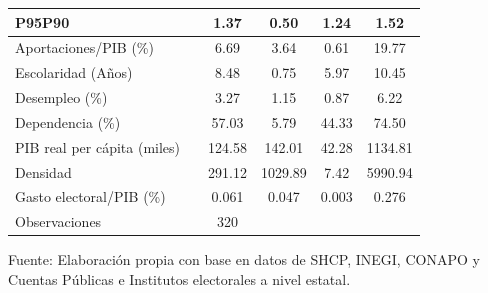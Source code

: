 \documentclass[11pt]{article}
\begin{document}
\begin{table}[H]
\begin{threeparttable}
\begin{tabular}{@{}lccccc@{}}
P95P90     &  & 1.37   & 0.50                & 1.24  & 1.52    \\ \midrule
Aportaciones/PIB (\%)   &  & 6.69   & 3.64       & 0.61  & 19.77   \\
Escolaridad (Años) &  & 8.48   & 0.75                & 5.97  & 10.45   \\
Desempleo (\%)          &  & 3.27   & 1.15                & 0.87  & 6.22    \\
Dependencia (\%)          &  & 57.03  & 5.79                & 44.33 & 74.50   \\
PIB real per cápita (miles)          &  & 124.58 & 142.01              & 42.28 & 1134.81 \\
Densidad        &  & 291.12 & 1029.89             & 7.42  & 5990.94 \\
Gasto electoral/PIB (\%)        &  & 0.061 & 0.047  & 0.003  & 0.276 \\ 
Observaciones        &  & 320 &   &   &  \\ 
\bottomrule
\end{tabular}
\begin{tablenotes}
\begin{tiny}
\begin{spacing}{1}
Fuente: Elaboración propia con base en datos de SHCP, INEGI, CONAPO y Cuentas Públicas e Institutos electorales a nivel estatal. 
\end{spacing}
\end{tiny}
\end{tablenotes}
\end{threeparttable}
\end{table}
\end{document}
